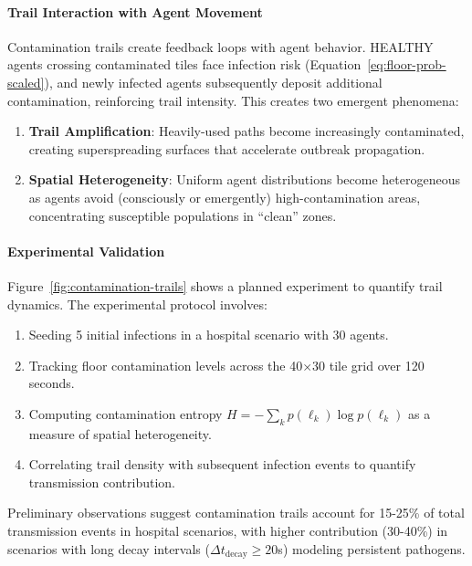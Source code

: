 \paragraph{Trail Interaction with Agent Movement}

Contamination trails create feedback loops with agent behavior. HEALTHY agents crossing contaminated tiles face infection risk (Equation~\ref{eq:floor-prob-scaled}), and newly infected agents subsequently deposit additional contamination, reinforcing trail intensity. This creates two emergent phenomena:

\begin{enumerate}
    \item \textbf{Trail Amplification}: Heavily-used paths become increasingly contaminated, creating superspreading surfaces that accelerate outbreak propagation.
    
    \item \textbf{Spatial Heterogeneity}: Uniform agent distributions become heterogeneous as agents avoid (consciously or emergently) high-contamination areas, concentrating susceptible populations in ``clean'' zones.
\end{enumerate}

\paragraph{Experimental Validation}

Figure~\ref{fig:contamination-trails} shows a planned experiment to quantify trail dynamics. The experimental protocol involves:

\begin{enumerate}
    \item Seeding 5 initial infections in a hospital scenario with 30 agents.
    \item Tracking floor contamination levels across the 40$\times$30 tile grid over 120 seconds.
    \item Computing contamination entropy $H = -\sum_k p(\ell_k) \log p(\ell_k)$ as a measure of spatial heterogeneity.
    \item Correlating trail density with subsequent infection events to quantify transmission contribution.
\end{enumerate}

Preliminary observations suggest contamination trails account for 15-25\% of total transmission events in hospital scenarios, with higher contribution (30-40\%) in scenarios with long decay intervals ($\Delta t_{\text{decay}} \geq 20$s) modeling persistent pathogens.

